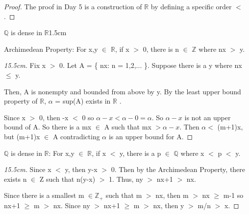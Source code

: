 	\begin{proof}
		The proof in Day 5 is a construction of $\mathbb{R}$ by defining a
		specific order $<$.
	\end{proof}

	\vspace{0.4cm}



	\begin{ltheorem}{$\mathbb{Q}$  is dense in $\mathbb{R}$}{1.5cm}
		\item {\color{lblue} Archimedean Property}:
			For x,y $\in$ $\mathbb{R}$, if x $>$ 0, there is n $\in$ $ \mathbb{Z} $
			where nx $>$ y.
	
			\begin{proof}[15.5cm]
				Fix x $>$ 0. Let A = \{ nx: n = 1,2,... \}.
				Suppose there is a y where nx $\leq$ y.

				Then, A is nonempty and bounded from above by y.
				By the least upper bound property of $ \mathbb{R} $,
				$\alpha$ = sup(A) exists in $ \mathbb{R} $ .

				Since x $>$ 0, then -x $<$ 0 so $\alpha - x < \alpha-0 = \alpha$.
				So $\alpha-x$ is not an upper bound of A.
				So there is a mx $\in$ A such that mx $> \alpha-x$.
				Then $\alpha <$ (m+1)x, but (m+1)x $\in$ A
				contradicting $\alpha$ is an upper bound for A.
			\end{proof}

		\item {\color{lblue} $ \mathbb{Q} $  is dense in $ \mathbb{R} $}:
			For x,y $\in$ $\mathbb{R}$, if x $<$ y,
			there is a p $\in$ $ \mathbb{Q} $ where x $<$ p $<$ y.

			\begin{proof}[15.5cm]
				Since x $<$ y, then y-x $>$ 0. Then by the Archimedean Property,
				there exists n $\in$ Z such that n(y-x) $>$ 1.
				Thus, ny $>$ nx+1 $>$ nx.

				Since there is a smallest m $\in \mathbb{Z_+} $ such that m $>$ nx,
				then m $>$ nx $\geq$ m-1 so nx+1 $\geq$ m $>$ nx.
				Since ny $>$ nx+1 $\geq$ m $>$ nx, then y $>$ m/n $>$ x.
			\end{proof}
	\end{ltheorem}




	